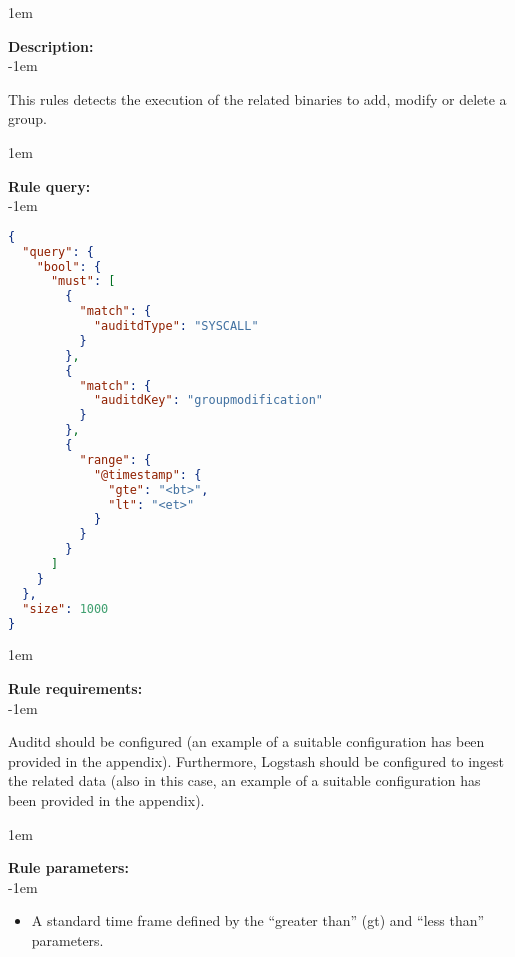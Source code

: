 \openup 1em

{\bf Description:} \\

\openup -1em
\vspace{-2em}


This rules detects the execution of the related binaries to add, modify or delete a group.

\openup 1em

{\bf Rule query:} \\

\openup -1em
\vspace{-2em}

\begin{lstlisting}[language=json,firstnumber=1]
{
  "query": {
    "bool": {
      "must": [
        {
          "match": {
            "auditdType": "SYSCALL"
          }
        },
        {
          "match": {
            "auditdKey": "groupmodification"
          }
        },
        {
          "range": {
            "@timestamp": {
              "gte": "<bt>",
              "lt": "<et>"
            }
          }
        }
      ]
    }
  },
  "size": 1000
}
\end{lstlisting}

\openup 1em

{\bf Rule requirements:} \\

\openup -1em
\vspace{-2em}

Auditd should be configured (an example of a suitable configuration has been provided in the appendix). Furthermore, Logstash should be configured to ingest the related data (also in this case, an example of a suitable configuration has been provided in the appendix).

\openup 1em

{\bf Rule parameters:} \\

\openup -1em
\vspace{-2em}

\begin{itemize}
	\item A standard time frame defined by the ``greater than'' (gt) and ``less than'' parameters.
\end{itemize}

